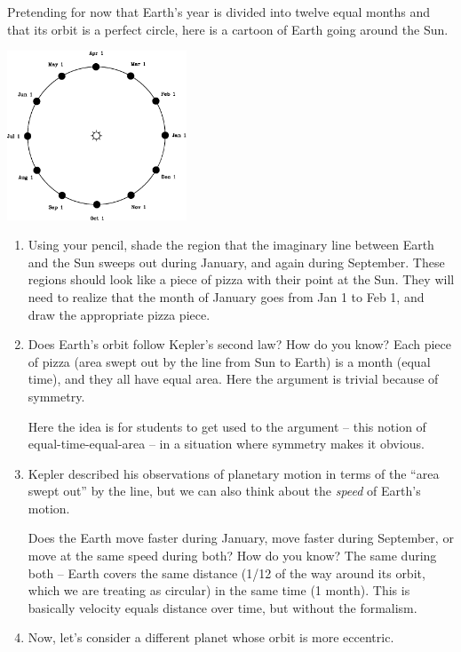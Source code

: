 \documentclass[12pt]{article}
\newcommand{\red}{\color{red}}
\begin{document}
Pretending for now that Earth's year is divided into twelve equal months and that its orbit is a perfect circle, here is a cartoon of Earth going around the Sun.
\begin{center}
\includegraphics[width=0.4\textwidth]{earth-crop.pdf}
\end{center}
\begin{enumerate}
\item Using your pencil, shade the region that the imaginary line between Earth and the Sun sweeps out during January, and again during September. These regions should look like a piece of pizza with their point at the Sun.
{\red They will need to realize that the month of January goes from Jan 1 to Feb 1, and draw the appropriate pizza piece.}
\item Does Earth's orbit follow Kepler's second law? How do you know? 
{\red Each piece of pizza (area swept out by the line from Sun to Earth) is a month (equal time), and they all have equal area. Here the argument is trivial because of symmetry.}

{\color{blue} Here the idea is for students to get used to the argument -- this notion of equal-time-equal-area -- in a situation where symmetry makes it obvious.}


\item Kepler described his observations of planetary motion in terms of the ``area swept out'' by the line, but we can also think about the {\it speed} of Earth's motion.

Does the Earth move faster during January, move faster during September, or move at the same speed during both? How do you know? {\red The same during both -- Earth covers the same distance (1/12 of the way around its orbit, which we are treating as circular) in the same time (1 month). This is basically velocity equals distance over time, but without the formalism.}

\newpage

\item Now, let's consider a different planet whose orbit is more eccentric. 


\end{enumerate}
\end{document}
